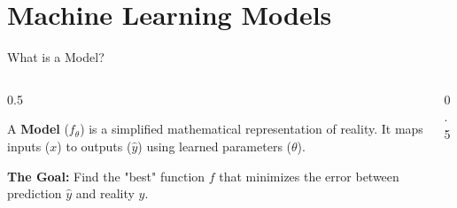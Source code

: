 \section{Machine Learning Models}

\begin{frame}{What is a Model?}
    \begin{columns}[c]
        \begin{column}{0.5\textwidth}
            \begin{tcolorbox}[colback=blue!5, title=\textbf{Definition}]
                A \textbf{Model} ($f_\theta$) is a simplified mathematical representation of reality.
                It maps inputs ($x$) to outputs ($\hat{y}$) using learned parameters ($\theta$).
            \end{tcolorbox}

            \vspace{1em}
            \textbf{The Goal:}
            Find the "best" function $f$ that minimizes the error between prediction $\hat{y}$ and reality $y$. 
            

        \end{column}

        \begin{column}{0.5\textwidth}
            \centering
\end{column}
\end{columns}
\end{frame}
